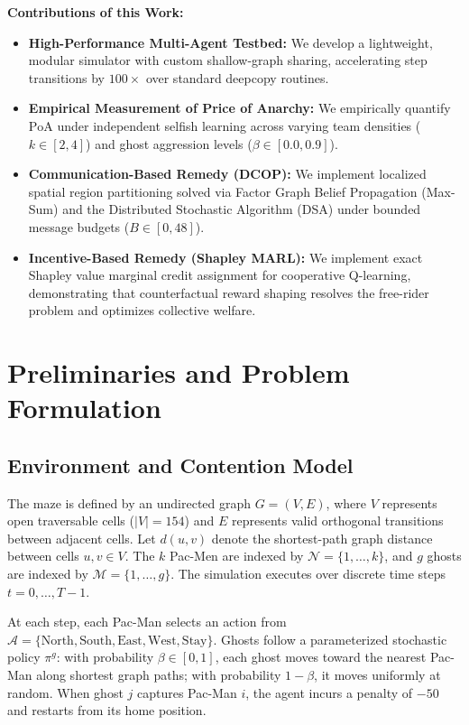 \documentclass{article}
\newcommand{\N}{\mathcal{N}}
\newcommand{\M}{\mathcal{M}}
\newcommand{\A}{\mathcal{A}}
\newcommand{\PoA}{\mathrm{PoA}}
\begin{document}
\noindent\textbf{Contributions of this Work:}
\begin{itemize}
    \item \textbf{High-Performance Multi-Agent Testbed:} We develop a lightweight, modular simulator with custom shallow-graph sharing, accelerating step transitions by $100\times$ over standard deepcopy routines.
    \item \textbf{Empirical Measurement of Price of Anarchy:} We empirically quantify $\PoA$ under independent selfish learning across varying team densities ($k \in [2, 4]$) and ghost aggression levels ($\beta \in [0.0, 0.9]$).
    \item \textbf{Communication-Based Remedy (DCOP):} We implement localized spatial region partitioning solved via Factor Graph Belief Propagation (Max-Sum) and the Distributed Stochastic Algorithm (DSA) under bounded message budgets ($B \in [0, 48]$).
    \item \textbf{Incentive-Based Remedy (Shapley MARL):} We implement exact Shapley value marginal credit assignment for cooperative Q-learning, demonstrating that counterfactual reward shaping resolves the free-rider problem and optimizes collective welfare.
\end{itemize}

\section{Preliminaries and Problem Formulation}

\subsection{Environment and Contention Model}
The maze is defined by an undirected graph $G = (V, E)$, where $V$ represents open traversable cells ($|V| = 154$) and $E$ represents valid orthogonal transitions between adjacent cells. Let $d(u, v)$ denote the shortest-path graph distance between cells $u, v \in V$. The $k$ Pac-Men are indexed by $\N = \{1, \ldots, k\}$, and $g$ ghosts are indexed by $\M = \{1, \ldots, g\}$. The simulation executes over discrete time steps $t = 0, \ldots, T-1$.

At each step, each Pac-Man selects an action from $\A = \{\mathrm{North}, \mathrm{South}, \mathrm{East}, \mathrm{West}, \mathrm{Stay}\}$. Ghosts follow a parameterized stochastic policy $\pi^g$: with probability $\beta \in [0, 1]$, each ghost moves toward the nearest Pac-Man along shortest graph paths; with probability $1 - \beta$, it moves uniformly at random. When ghost $j$ captures Pac-Man $i$, the agent incurs a penalty of $-50$ and restarts from its home position.
\end{document}
